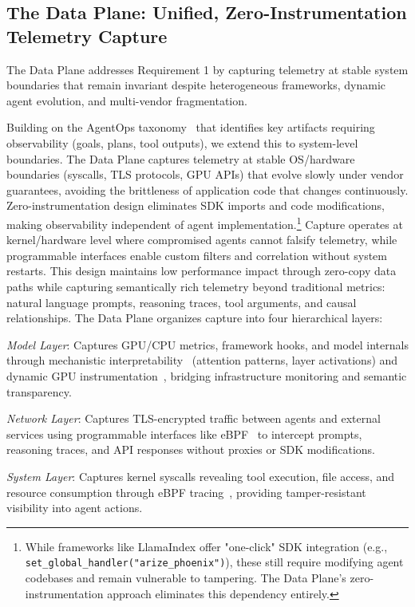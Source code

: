 \documentclass[sigplan,screen,9pt]{acmart}
\begin{document}
\subsection{The Data Plane: Unified, Zero-Instrumentation Telemetry Capture}

The Data Plane addresses Requirement 1 by capturing telemetry at stable system boundaries that remain invariant despite heterogeneous frameworks, dynamic agent evolution, and multi-vendor fragmentation.

Building on the AgentOps taxonomy~\cite{Dong2024AgentOps} that identifies key artifacts requiring observability (goals, plans, tool outputs), we extend this to system-level boundaries. The Data Plane captures telemetry at stable OS/hardware boundaries (syscalls, TLS protocols, GPU APIs) that evolve slowly under vendor guarantees, avoiding the brittleness of application code that changes continuously. Zero-instrumentation design eliminates SDK imports and code modifications, making observability independent of agent implementation.\footnote{While frameworks like LlamaIndex offer "one-click" SDK integration (e.g., \texttt{set\_global\_handler("arize\_phoenix")}), these still require modifying agent codebases and remain vulnerable to tampering. The Data Plane's zero-instrumentation approach eliminates this dependency entirely.} Capture operates at kernel/hardware level where compromised agents cannot falsify telemetry, while programmable interfaces enable custom filters and correlation without system restarts. This design maintains low performance impact through zero-copy data paths while capturing semantically rich telemetry beyond traditional metrics: natural language prompts, reasoning traces, tool arguments, and causal relationships. The Data Plane organizes capture into four hierarchical layers:

\emph{Model Layer}: Captures GPU/CPU metrics, framework hooks, and model internals through mechanistic interpretability~\cite{Kim2025AgenticInterp} (attention patterns, layer activations) and dynamic GPU instrumentation~\cite{yang2025egpu}, bridging infrastructure monitoring and semantic transparency.

\emph{Network Layer}: Captures TLS-encrypted traffic between agents and external services using programmable interfaces like eBPF~\cite{zheng2025extending} to intercept prompts, reasoning traces, and API responses without proxies or SDK modifications.

\emph{System Layer}: Captures kernel syscalls revealing tool execution, file access, and resource consumption through eBPF tracing~\cite{brendangregg,ebpfio}, providing tamper-resistant visibility into agent actions.
\end{document}
